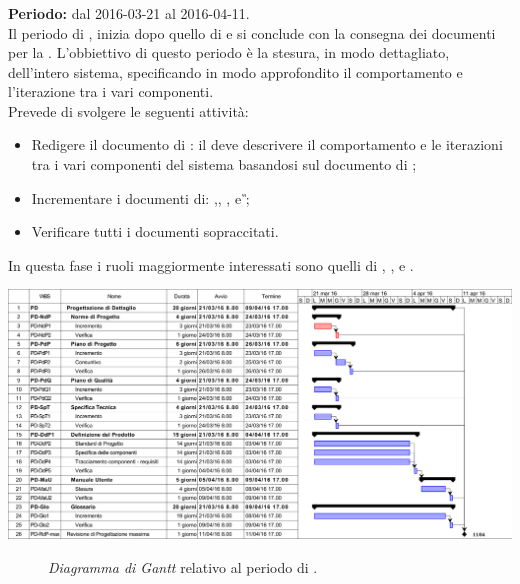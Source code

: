 \subsubsection{\PD}
\textbf{Periodo:} dal 2016-03-21 al 2016-04-11. \\
Il periodo di \PD, inizia dopo quello di \PA e si conclude con la consegna dei documenti per la \RP. L'obbiettivo di questo periodo è la stesura, in modo dettagliato, dell'intero sistema, specificando in modo approfondito il comportamento e l'iterazione tra i vari componenti. \\
Prevede di svolgere le seguenti attività:
\begin{itemize}
	\item Redigere il documento di \textit{\DDP}: il \textit{\Prog} deve descrivere il comportamento e le iterazioni tra i vari componenti del sistema basandosi sul documento di \textit{\ST};  
	\item Incrementare i documenti di: \textit{\NdP},\textit{\PdP}, \textit{\PdQ}, \textit{\ST} e \textit{\G};
	\item Verificare tutti i documenti sopraccitati.
\end{itemize}
In questa fase i ruoli maggiormente interessati sono quelli di \textit{\Amm}, \textit{\Res}, \textit{\Prog} e \textit{\Ver}. 
\begin{center}
	\includegraphics[keepaspectratio = true, width=16cm]{immagini/PdP_ProgettazioneDiDettaglioGantt.png}
\end{center}
\begin{figure}[h]
	\caption{\textit{Diagramma di Gantt} relativo al periodo di \PD.}\label{etichetta}
\end{figure}

